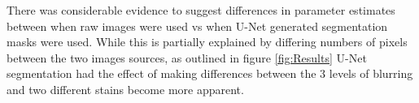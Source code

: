 \documentclass[isoft]{poster_class_UofC}
\begin{document}
\begin{poster}
                \vspace{1cm}
            \begin{table}
                \centering
                \captionsetup{type=table}
                \setlength{\tabcolsep}{20pt}
                \caption{Performance of regression models on validation data set}
                \label{tab:Results}
            \end{table}
            \vspace{1cm}
            

There was considerable evidence to suggest differences in parameter estimates between when raw images were used vs when U-Net generated segmentation masks were used.  While this is partially explained by differing numbers of pixels between the two images sources, as outlined in figure \ref{fig:Results} U-Net segmentation had the effect of making differences between the 3 levels of blurring and two different stains become more apparent. 


\end{poster}
\end{document}
